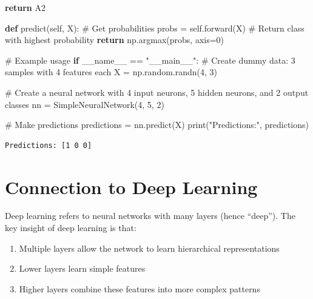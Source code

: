 \documentclass[
  letterpaper,
  DIV=11,
  numbers=noendperiod]{scrreprt}
\newenvironment{Shaded}{\begin{snugshade}}{\end{snugshade}}
\newcommand{\BuiltInTok}[1]{\textcolor[rgb]{0.00,0.23,0.31}{#1}}
\newcommand{\CommentTok}[1]{\textcolor[rgb]{0.37,0.37,0.37}{#1}}
\newcommand{\ControlFlowTok}[1]{\textcolor[rgb]{0.00,0.23,0.31}{\textbf{#1}}}
\newcommand{\DecValTok}[1]{\textcolor[rgb]{0.68,0.00,0.00}{#1}}
\newcommand{\KeywordTok}[1]{\textcolor[rgb]{0.00,0.23,0.31}{\textbf{#1}}}
\newcommand{\NormalTok}[1]{\textcolor[rgb]{0.00,0.23,0.31}{#1}}
\newcommand{\OperatorTok}[1]{\textcolor[rgb]{0.37,0.37,0.37}{#1}}
\newcommand{\StringTok}[1]{\textcolor[rgb]{0.13,0.47,0.30}{#1}}
\newcommand{\VariableTok}[1]{\textcolor[rgb]{0.07,0.07,0.07}{#1}}
\providecommand{\tightlist}{%
  \setlength{\itemsep}{0pt}\setlength{\parskip}{0pt}}\usepackage{longtable,booktabs,array}
\begin{document}
\begin{Shaded}
\begin{Highlighting}[]
        \ControlFlowTok{return}\NormalTok{ A2}
    
    \KeywordTok{def}\NormalTok{ predict(}\VariableTok{self}\NormalTok{, X):}
        \CommentTok{\# Get probabilities}
\NormalTok{        probs }\OperatorTok{=} \VariableTok{self}\NormalTok{.forward(X)}
        \CommentTok{\# Return class with highest probability}
        \ControlFlowTok{return}\NormalTok{ np.argmax(probs, axis}\OperatorTok{=}\DecValTok{0}\NormalTok{)}

\CommentTok{\# Example usage}
\ControlFlowTok{if} \VariableTok{\_\_name\_\_} \OperatorTok{==} \StringTok{"\_\_main\_\_"}\NormalTok{:}
    \CommentTok{\# Create dummy data: 3 samples with 4 features each}
\NormalTok{    X }\OperatorTok{=}\NormalTok{ np.random.randn(}\DecValTok{4}\NormalTok{, }\DecValTok{3}\NormalTok{)}
    
    \CommentTok{\# Create a neural network with 4 input neurons, 5 hidden neurons, and 2 output classes}
\NormalTok{    nn }\OperatorTok{=}\NormalTok{ SimpleNeuralNetwork(}\DecValTok{4}\NormalTok{, }\DecValTok{5}\NormalTok{, }\DecValTok{2}\NormalTok{)}
    
    \CommentTok{\# Make predictions}
\NormalTok{    predictions }\OperatorTok{=}\NormalTok{ nn.predict(X)}
    \BuiltInTok{print}\NormalTok{(}\StringTok{"Predictions:"}\NormalTok{, predictions)}
\end{Highlighting}
\end{Shaded}

\begin{verbatim}
Predictions: [1 0 0]
\end{verbatim}

\section{Connection to Deep Learning}\label{connection-to-deep-learning}

Deep learning refers to neural networks with many layers (hence
``deep''). The key insight of deep learning is that:

\begin{enumerate}
\def\labelenumi{\arabic{enumi}.}
\tightlist
\item
  Multiple layers allow the network to learn hierarchical
  representations
\item
  Lower layers learn simple features
\item
  Higher layers combine these features into more complex patterns
\end{enumerate}
\end{document}

